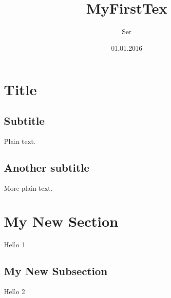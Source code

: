 \documentclass{article}
\begin{document}
\title{MyFirstTex}
\author{Ser}
\date{01.01.2016}
\maketitle

\section{Title}

\subsection{Subtitle}

Plain text.

\subsection{Another subtitle}

More plain text.

\section{My New Section}
Hello 1
\subsection{My New Subsection}
Hello 2
\end{document}
